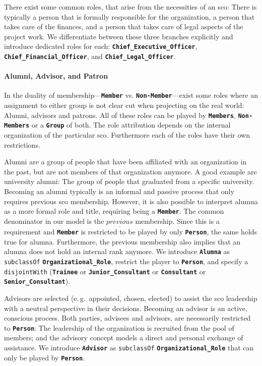 \documentclass[a4paper, DIV=13, BCOR=0cm]{scrbook}
\newcommand{\eg}{e.\,g.\ }
\newcommand{\class}[1]{\texttt{\textbf{#1}}}
\newcommand{\relation}[1]{\texttt{#1}}
\begin{document}
There exist some common roles, that arise from the necessities of an \gls{sco}: There is typically a person that is formally responsible for the organization, a person that takes care of the finances, and a person that takes care of legal aspects of the project work. We differentiate between these three branches explicitly and introduce dedicated roles for each: \class{Chief\_Executive\_Officer}, \class{Chief\_Financial\_Officer}, and \class{Chief\_Legal\_Officer}.

\paragraph{Alumni, Advisor, and Patron}
In the duality of membership---\class{Member} vs. \class{Non-Member}---exist some roles where an assignment to either group is not clear cut when projecting on the real world: Alumni, advisors and patrons. All of these roles can be played by \class{Members}, \class{Non-Members} or a \class{Group} of both. The role attribution depends on the internal organization of the particular \gls{sco}. Furthermore each of the roles have their own restrictions.

Alumni are a group of people that have been affiliated with an organization in the past, but are not members of that organization anymore. A good example are university alumni: The group of people that graduated from a specific university. Becoming an alumni typically is an informal and passive process that only requires previous \gls{sco} membership. However, it is also possible to interpret alumna as a more formal role and title, requiring being a \class{Member}. The common denominator in our model is the $\underline{previous}$ membership. Since this is a requirement and \class{Member} is restricted to be played by only \class{Person}, the same holds true for alumna. Furthermore, the previous membership also implies that an alumna does not hold an internal rank anymore. We introduce \class{Alumna} as \relation{subclassOf} \class{Organizational\_Role}, restrict the player to \class{Person}, and specify a \relation{disjointWith} (\class{Trainee} or \class{Junior\_Consultant} or \class{Consultant} or \class{Senior\_Consultant}).

Advisors are selected (\eg appointed, chosen, elected) to assist the \gls{sco} leadership with a neutral perspective in their decisions. Becoming an advisor is an active, conscious process. Both parties, advisees and advisors, are necessarily restricted to \class{Person}: The leadership of the organization is recruited from the pool of members; and the advisory concept models a direct and personal exchange of assistance. We introduce \class{Advisor} as \relation{subclassOf} \class{Organizational\_Role} that can only be played by \class{Person}.
\end{document}
